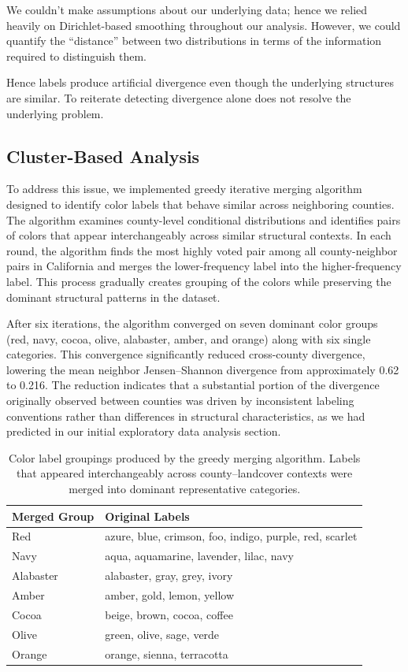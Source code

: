 \documentclass[11pt,letterpaper]{article}
\begin{document}
We couldn't make assumptions about our underlying data; hence we relied heavily on Dirichlet-based smoothing throughout our analysis. However, we could quantify the “distance” between two distributions in terms of the information required to distinguish them.

Hence labels produce artificial divergence even though the underlying structures are similar. To reiterate detecting divergence alone does not resolve the underlying problem.

\subsection{Cluster-Based Analysis}

To address this issue, we implemented greedy iterative merging algorithm designed to identify color labels that behave similar across neighboring counties. The algorithm examines county-level conditional distributions and identifies pairs of colors that appear interchangeably across similar structural contexts. In each round, the algorithm finds the most highly voted pair among all county-neighbor pairs in California and merges the lower-frequency label into the higher-frequency label. This process gradually creates grouping of the colors while preserving the dominant structural patterns in the dataset.

After six iterations, the algorithm converged on seven dominant color groups (red, navy, cocoa, olive, alabaster, amber, and orange) along with six single categories. This convergence significantly reduced cross-county divergence, lowering the mean neighbor Jensen–Shannon divergence from approximately 0.62 to 0.216. The reduction indicates that a substantial portion of the divergence originally observed between counties was driven by inconsistent labeling conventions rather than differences in structural characteristics, as we had predicted in our initial exploratory data analysis section.

\begin{table}[htbp]
\centering
\begin{tabular}{ll}
\hline
\textbf{Merged Group} & \textbf{Original Labels} \\
\hline
Red        & azure, blue, crimson, foo, indigo, purple, red, scarlet \\
Navy       & aqua, aquamarine, lavender, lilac, navy \\
Alabaster  & alabaster, gray, grey, ivory \\
Amber      & amber, gold, lemon, yellow \\
Cocoa      & beige, brown, cocoa, coffee \\
Olive      & green, olive, sage, verde \\
Orange     & orange, sienna, terracotta \\
\hline
\end{tabular}
\caption{Color label groupings produced by the greedy merging algorithm. Labels that appeared interchangeably across county--landcover contexts were merged into dominant representative categories.}
\end{table}
\end{document}

